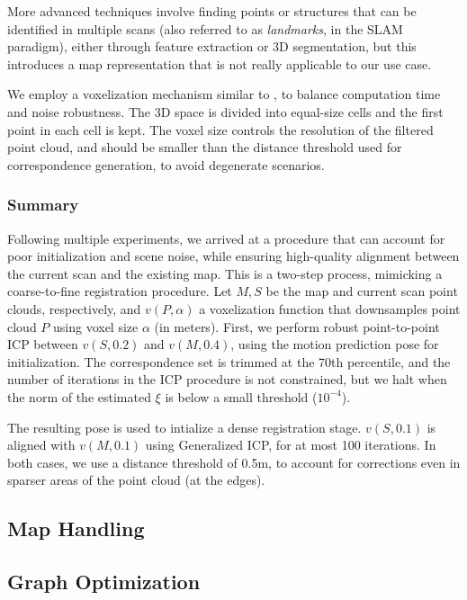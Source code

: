 More advanced techniques involve finding points or structures that can be identified in multiple scans (also referred to as \emph{landmarks}, in the SLAM paradigm), either through feature extraction \cite{fpfh} or 3D segmentation, but this introduces a map representation that is not really applicable to our use case.

We employ a voxelization mechanism similar to \cite{vizzo2023ral}, to balance computation time and noise robustness. The 3D space is divided into equal-size cells and the first point in each cell is kept. The voxel size controls the resolution of the filtered point cloud, and should be smaller than the distance threshold used for correspondence generation, to avoid degenerate scenarios.

\subsubsection{Summary}

Following multiple experiments, we arrived at a procedure that can account for poor initialization and scene noise, while ensuring high-quality alignment between the current scan and the existing map. This is a two-step process, mimicking a coarse-to-fine registration procedure. Let $M, S$ be the map and current scan point clouds, respectively, and $v(P, \alpha)$ a voxelization function that downsamples point cloud $P$ using voxel size $\alpha$ (in meters). First, we perform robust point-to-point ICP between $v(S, 0.2)$ and $v(M, 0.4)$, using the motion prediction pose for initialization. The correspondence set is trimmed at the 70th percentile, and the number of iterations in the ICP procedure is not constrained, but we halt when the norm of the estimated $\xi$ is below a small threshold ($10^{-4}$).

The resulting pose is used to intialize a dense registration stage. $v(S, 0.1)$ is aligned with $v(M, 0.1)$ using Generalized ICP, for at most 100 iterations. In both cases, we use a distance threshold of 0.5m, to account for corrections even in sparser areas of the point cloud (\eg at the edges).



\subsection{Map Handling}

\subsection{Graph Optimization}
\label{subsec:graph-optimization}

